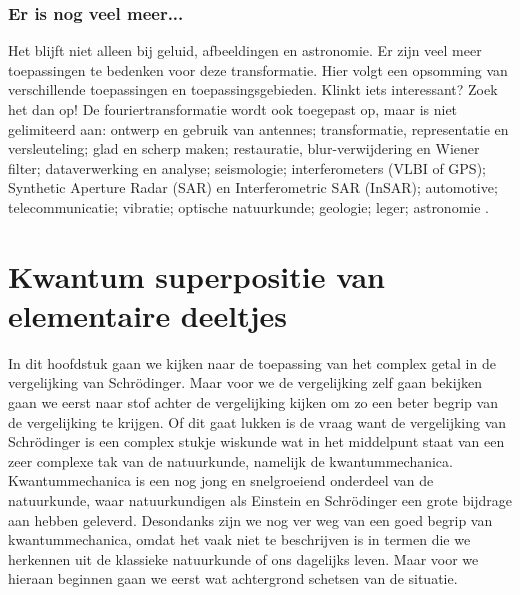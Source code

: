 \documentclass[11pt,fleqn]{book} %
\begin{document}
\subsection{Er is nog veel meer...}
Het blijft niet alleen bij geluid, afbeeldingen en astronomie. Er zijn veel meer toepassingen te bedenken voor deze transformatie. Hier volgt een opsomming van verschillende toepassingen en toepassingsgebieden. Klinkt iets interessant? Zoek het dan op!
De fouriertransformatie wordt ook toegepast op, maar is niet gelimiteerd aan: ontwerp en gebruik van antennes; transformatie, representatie en versleuteling; glad en scherp maken; restauratie, blur-verwijdering en Wiener filter; dataverwerking en analyse; seismologie; interferometers (VLBI of GPS); Synthetic Aperture Radar (SAR) en Interferometric SAR (InSAR); automotive; telecommunicatie; vibratie; optische natuurkunde; geologie; leger; astronomie \cite{in}\cite{gp}.


\chapter{Kwantum superpositie van elementaire deeltjes}
In dit hoofdstuk gaan we kijken naar de toepassing van het complex getal in de vergelijking van Schrödinger. Maar voor we de vergelijking zelf gaan bekijken gaan we eerst naar stof achter de vergelijking kijken om zo een beter begrip van de vergelijking te krijgen. Of dit gaat lukken is de vraag want de vergelijking van Schrödinger is een complex stukje wiskunde wat in het middelpunt staat van een zeer complexe tak van de natuurkunde, namelijk de kwantummechanica. Kwantummechanica is een nog jong en snelgroeiend onderdeel van de natuurkunde, waar natuurkundigen als Einstein en Schrödinger een grote bijdrage aan hebben geleverd. Desondanks zijn we nog ver weg van een goed begrip van kwantummechanica, omdat het vaak niet te beschrijven is in termen die we herkennen uit de klassieke natuurkunde of ons dagelijks leven. Maar voor we hieraan beginnen gaan we eerst wat achtergrond schetsen van de situatie.
\end{document}
